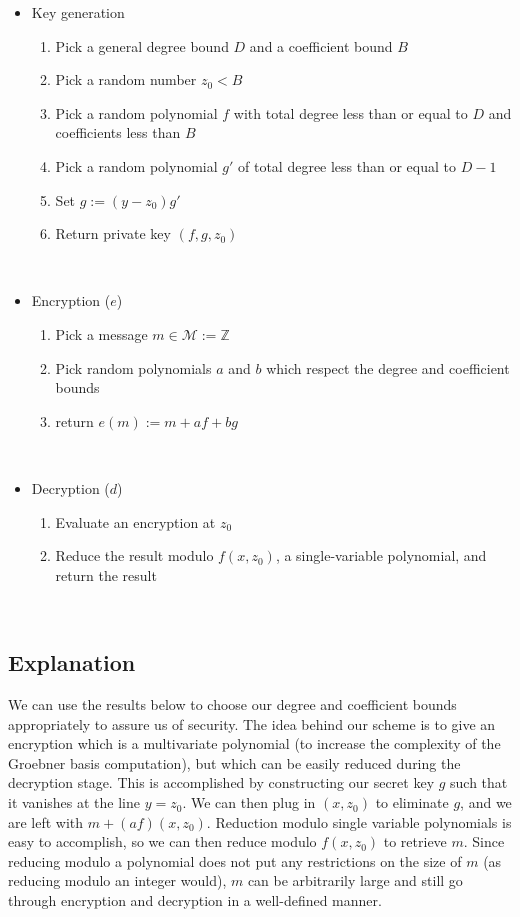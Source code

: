 \documentclass[11pt]{report}
\newcommand{\Z}{\mathbb{Z}}
\newcommand{\M}{\mathcal{M}}
\begin{document}
\begin{itemize}
\item Key generation
\begin{enumerate}
\item Pick a general degree bound $D$ and a coefficient bound $B$
\item Pick a random number $z_0 < B$
\item Pick a random polynomial $f$ with total degree less than or equal to $D$ and coefficients less than $B$
\item Pick a random polynomial $g'$ of total degree less than or equal to $D-1$
\item Set $g := (y-z_0)g'$
\item Return private key $(f,g,z_0)$
\end{enumerate}

\

\item Encryption ($e$)
\begin{enumerate}
\item Pick a message $m\in \M := \Z$
\item Pick random polynomials $a$ and $b$ which respect the degree and coefficient bounds
\item return $e(m) := m+af+bg$
\end{enumerate}

\

\item Decryption ($d$)
\begin{enumerate}
\item Evaluate an encryption at $z_0$
\item Reduce the result modulo $f(x,z_0)$, a single-variable polynomial, and return the result
\end{enumerate}
\end{itemize}

\

\subsection{Explanation}

We can use the results below to choose our degree and coefficient bounds appropriately to assure us of security. The idea behind our scheme is to give an encryption
which is a multivariate polynomial (to increase the complexity of the Groebner basis computation), but which can be easily reduced during the decryption stage.
This is accomplished by constructing our secret key $g$ such that it vanishes at the line $y=z_0$. We can then plug in $(x,z_0)$ to eliminate $g$, and we are left
with $m+(af)(x,z_0)$. Reduction modulo single variable polynomials is easy to accomplish, so we can then reduce modulo $f(x,z_0)$ to retrieve $m$. Since reducing
modulo a polynomial does not put any restrictions on the size of $m$ (as reducing modulo an integer would), $m$ can be arbitrarily large and still go through
encryption and decryption in a well-defined manner.
\end{document}
